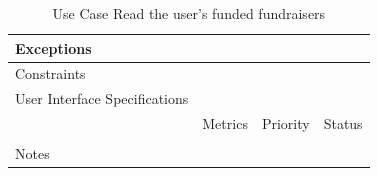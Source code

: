 \begin{table}[H]
\begin{tabularx}{\linewidth}{|l|X|X|X|}
            \hline Exceptions                    & \multicolumn{3}{l|}{}                                                                                 \\

            \hline Constraints                   & \multicolumn{3}{l|}{}                                                                                 \\

            \hline User Interface Specifications & \multicolumn{3}{l|}{}                                                                                 \\

            \hline \multirow{2}{*}{}             & Metrics                                                                           & Priority & Status \\
            \cline{2-4}                          &                                                                                   &          &        \\
            \hline Notes                         & \multicolumn{3}{l|}{}                                                                                 \\
            \hline
      \end{tabularx}
      \caption{Use Case Read the user's funded fundraisers}
      \label{tab:use_case_Read_funded_fundraisers}
\end{table}


